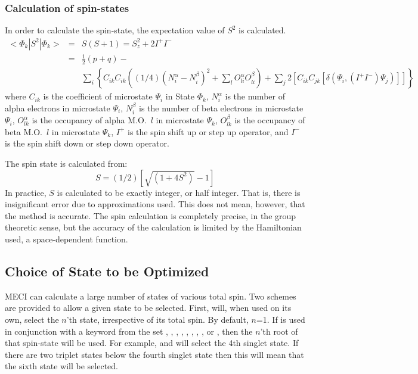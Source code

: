 \subsubsection{Calculation of spin-states}
In order to calculate the spin-state, the expectation value  of  $S^2$ is
calculated.
\begin{eqnarray*}
<\Phi_k|S^2|\Phi_k> & = & S(S+1) = S_z^2 + 2 I^+I^-   \\
   & = & \frac{1}{2}(p+q) - \\
   &&\sum_i
\left\{C_{ik}C_{ik}
\left((1/4)(N^{\alpha}_i-N^{\beta}_i)^2
+ \sum_l O^{\alpha}_{li} O^{\beta}_{li}\right)
+ \sum_j2
\left[C_{ik}C_{jk} [\delta(\Psi_i,(I^+I^-)\Psi_j) ]\right]
\right\}
\end{eqnarray*}
where  $C_{ik}$  is the coefficient of microstate $\Psi_i$ in State $\Phi_k$,
$N^{\alpha}_i$ is the number of alpha electrons in microstate $\Psi_i$,
$N^{\beta}_i $ is the number of beta electrons in microstate $\Psi_i$,
$O^{\alpha}_{lk}$ is the occupancy of alpha M.O.\ $l$ in microstate $\Psi_k$,
$O^{\beta}_{lk}$ is the occupancy of beta M.O.\ $l$ in microstate $\Psi_k$,
$I^+$ is the spin shift up or step up operator,  and  $I^- $ is the spin shift
down or step down operator.

The spin state is calculated from:
$$
S = (1/2) [\sqrt{(1+4 S^2)} - 1 ]
$$
In practice, $S$  is  calculated  to  be  exactly  integer,  or  half
integer.   That  is,  there is insignificant error due to approximations used.
This does not mean, however, that the method  is  accurate.   The spin
calculation  is  completely precise, in the group theoretic sense, but the
accuracy of the calculation is limited by the Hamiltonian  used, a
space-dependent function.

\subsection{Choice of State to be Optimized}\label{cos}
MECI can calculate a large number of states of various total  spin. Two
schemes are provided to allow a given state to be selected.  First,
 will, when used on its own, select the $n$'th  state,
irrespective of  its  total  spin.  By default, $n$=1.  If  is
used in conjunction with a keyword from the set , , ,  , , ,
,  , or , then  the  $n$'th  root of that
spin-state  will be used.  For example,  and  will
select the 4th singlet state.  If there are  two  triplet  states  below the
fourth singlet state then this will mean that the sixth state will be selected.

